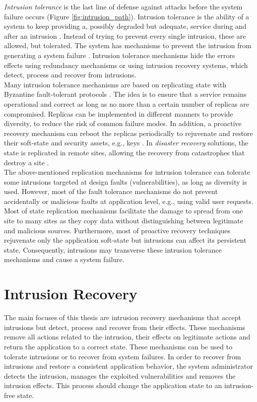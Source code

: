 \emph{Intrusion tolerance} is the last line of defense against attacks before the system failure occurs (Figure \ref{fig:intrusion_path}). Intrusion tolerance is the ability of a system to keep providing a, possibly degraded but adequate, service during and after an intrusion \cite{Stavridou2001a}. Instead of trying to prevent every single intrusion, these are allowed, but tolerated. The system has mechanisms to prevent the intrusion from generating a system failure \cite{Verissimo2003}. Intrusion tolerance mechanisms hide the errors effects using redundancy mechanisms or using intrusion recovery systems, which detect, process and recover from intrusions.\\

Many intrusion tolerance mechanisms are based on replicating state with Byzantine fault-tolerant protocols \cite{Schneider1990,Castro2002,Veronese2011}. The idea is to ensure that a service remains operational and correct as long as no more than a certain number of replicas are compromised. Replicas can be implemented in different manners to provide diversity, to reduce the risk of common failure modes. In addition, a proactive recovery mechanism can reboot the replicas periodically to rejuvenate and restore their soft-state and security assets, e.g., keys \cite{Candea2001,Castro2002,Sousa2010}. In \emph{disaster recovery} solutions, the state is replicated in remote sites, allowing the recovery from catastrophes that destroy a site \cite{cloud-disaster}.\\

The above-mentioned replication mechanisms for intrusion tolerance can tolerate some intrusions targeted at design faults (vulnerabilities), as long as diversity is used. However, most of the fault tolerance mechanisms do not prevent accidentally or malicious faults at application level, e.g., using valid user requests. Most of state replication mechanisms facilitate the damage to spread from one site to many sites as they copy data without distinguishing between legitimate and malicious sources. Furthermore, most of proactive recovery techniques rejuvenate only the application soft-state but intrusions can affect its persistent state. Consequently, intrusions may transverse these intrusion tolerance mechanisms and cause a system failure. 


\section{Intrusion Recovery}
\label{sec:related:recovery}
The main focuses of this thesis are intrusion recovery mechanisms that accept intrusions but detect, process and recover from their effects. These mechanisms remove all actions related to the intrusion, their effects on legitimate actions and return the application to a correct state. These mechanisms can be used to tolerate intrusions or to recover from system failures. In order to recover from intrusions and restore a consistent application behavior, the system administrator detects the intrusion, manages the exploited vulnerabilities and removes the intrusion effects. This process should change the application state to an intrusion-free state.\\

